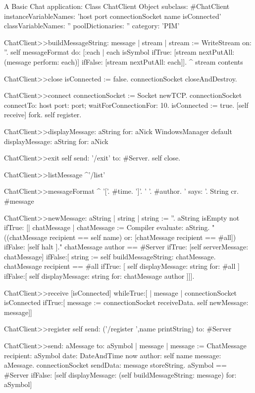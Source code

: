 \documentclass[a4paper,10pt,twoside]{book}
\begin{document}
\begin{script}{A Basic Chat application: Class ChatClient}
Object subclass: #ChatClient
	instanceVariableNames: 'host port connectionSocket name isConnected'
	classVariableNames: ''
	poolDictionaries: ''
	category: 'PIM'

ChatClient>>buildMessageString: message
	| stream |
	stream := WriteStream on: ''.
	self messageFormat do: [:each |
		each isSymbol
			ifTrue: [stream nextPutAll: (message perform: each)]
			ifFalse: [stream nextPutAll: each]].
	^ stream contents

ChatClient>>close
	isConnected := false.
	connectionSocket closeAndDestroy.

ChatClient>>connect
	connectionSocket := Socket newTCP.	
	connectionSocket 
		connectTo: host port: port; 
		waitForConnectionFor: 10.
	isConnected := true.
	[self receive] fork.
	self register.

ChatClient>>displayMessage: aString for: aNick
	WindowsManager default displayMessage: aString for: aNick
	
ChatClient>>exit
	self send: '/exit' to: #Server.
	self close.

ChatClient>>listMessage
	^'/list'

ChatClient>>messageFormat
	^ {'['. #time. ']'. ' '. #author. ' says: '. String cr. #message }

ChatClient>>newMessage: aString
	| string |
	string := ''.
	aString isEmpty not ifTrue: [| chatMessage |
		chatMessage := Compiler evaluate: aString.
		"((chatMessage recipient == self name) or: [chatMessage recipient == #all])
			ifFalse: [self halt ]."
		chatMessage author == #Server
			ifTrue: [self serverMessage: chatMessage]
			ifFalse:[
				string := self buildMessageString: chatMessage.
				chatMessage recipient == #all
					ifTrue: [ self displayMessage: string for: #all ]
					ifFalse:[ self displayMessage: string for: chatMessage author ]]].

ChatClient>>receive
	[isConnected]
		whileTrue:[
			| message |
			connectionSocket isConnected
				ifTrue:[
					message := connectionSocket receiveData.
					self newMessage: message]]

ChatClient>>register
	self send: ('/register ',name printString) to: #Server

ChatClient>>send: aMessage to: aSymbol
	| message |
	message := ChatMessage
					recipient: aSymbol
					date: DateAndTime now
					author: self name
					message: aMessage.
	connectionSocket sendData: message storeString.
	aSymbol == #Server
		ifFalse: [self displayMessage: (self buildMessageString: message) for: aSymbol]


\end{script}
\end{document}
